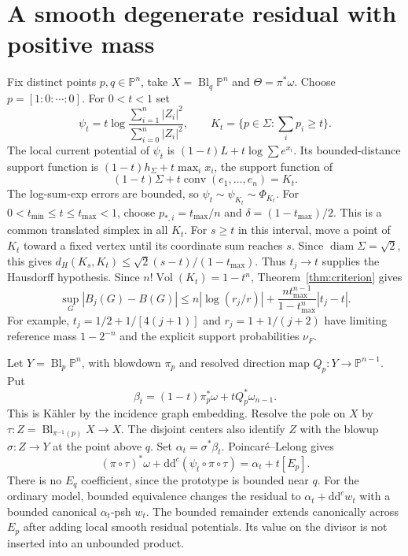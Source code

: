 \documentclass[11pt]{article}
\newcommand{\ddc}{\mathrm d\mathrm d^c}
\newcommand{\Vol}{\operatorname{Vol}}
\newcommand{\CP}{\mathbb P}
\begin{document}
\section{A smooth degenerate residual with positive mass}

Fix distinct points $p,q\in\CP^n$, take $X=\operatorname{Bl}_q\CP^n$
and $\Theta=\pi^*\omega$. Choose $p=[1:0:\cdots:0]$. For $0<t<1$ set
\[
 \psi_t=t\log\frac{\sum_{i=1}^n|Z_i|^2}{\sum_{i=0}^n|Z_i|^2},
 \qquad K_t=\{p\in\Sigma:\textstyle\sum_i p_i\ge t\}.
\]
The local current potential of $\psi_t$ is
$(1-t)L+t\log\sum e^{x_i}$. Its bounded-distance support function is
$(1-t)h_\Sigma+t\max_i x_i$, the support function of
\[
 (1-t)\Sigma+t\operatorname{conv}(e_1,\ldots,e_n)=K_t.
\]
The log-sum-exp errors are bounded, so
$\psi_t\sim\psi_{K_t}\sim\Phi_{K_t}$.
For $0<t_{\min}\le t\le t_{\max}<1$, choose
$p_{*,i}=t_{\max}/n$ and $\delta=(1-t_{\max})/2$.
This is a common translated simplex in all $K_t$.
For $s\ge t$ in this interval, move a point of $K_t$ toward a fixed
vertex until its coordinate sum reaches $s$. Since $\operatorname{diam}\Sigma=\sqrt2$,
this gives $d_H(K_s,K_t)\le\sqrt2(s-t)/(1-t_{\max})$.
Thus $t_j\to t$ supplies the Hausdorff hypothesis.
Since $n!\Vol(K_t)=1-t^n$, Theorem~\ref{thm:criterion} gives
\[
 \sup_G|B_j(G)-B(G)|
 \le n|\log(r_j/r)|+
       \frac{nt_{\max}^{n-1}}{1-t_{\max}^n}|t_j-t|.
\]
For example, $t_j=1/2+1/[4(j+1)]$ and $r_j=1+1/(j+2)$
have limiting reference mass $1-2^{-n}$ and the explicit support
probabilities $\nu_F$.

Let $Y=\operatorname{Bl}_p\CP^n$, with blowdown $\pi_p$ and resolved
direction map $Q_p:Y\to\CP^{n-1}$. Put
\[
 \beta_t=(1-t)\pi_p^*\omega+tQ_p^*\omega_{n-1}.
\]
This is K\"ahler by the incidence graph embedding.
Resolve the pole on $X$ by $\tau:Z=\operatorname{Bl}_{\pi^{-1}(p)}X\to X$.
The disjoint centers also identify $Z$ with the blowup
$\sigma:Z\to Y$ at the point above $q$. Set $\alpha_t=\sigma^*\beta_t$.
Poincar\'e--Lelong gives
\begin{equation}\label{eq:residual}
 (\pi\circ\tau)^*\omega+\ddc(\psi_t\circ\pi\circ\tau)
                 =\alpha_t+t[E_p].
\end{equation}
There is no $E_q$ coefficient, since the prototype is bounded near $q$.
For the ordinary model, bounded equivalence changes the residual to
$\alpha_t+\ddc w_t$ with a bounded canonical $\alpha_t$-psh $w_t$.
The bounded remainder extends canonically across $E_p$ after adding
local smooth residual potentials. Its value on the divisor is not
inserted into an unbounded product.
\end{document}
